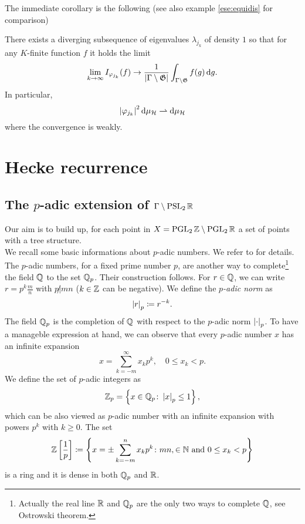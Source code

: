 The immediate corollary is the following (see also example \ref{ese:equidis} for comparison)

\begin{ncor}
There exists a diverging subsequence of eigenvalues $\lambda_{j_{k}}$ of density $1$ so that for any $K$-finite function $f$ it holds the limit
\[
\lim_{k\to\infty}I_{\varphi_{j_{k}}}(f)\to\frac{1}{\left| \Gamma\setminus\mathfrak{G}\right|}\int_{\Gamma\setminus\mathfrak{G}}f(g)\mathop{}\!\mathrm{d} g.
\]
In particular, 
\[
\left| \varphi_{j_{k}}\right|^{2}\mathop{}\!\mathrm{d}\mu_{\mathcal{H}}\rightharpoonup\mathop{}\!\mathrm{d}\mu_{\mathcal{H}}
\]
where the convergence is weakly.
\end{ncor}




\section{Hecke recurrence}

\subsection{The $p$-adic extension of $\Gamma\setminus\operatorname{PSL}_{2}\mathbb{R}$}

\label{sec:p_adic_ext}


Our aim is to build up, for each point in $X=\operatorname{PGL}_{2}\mathbb{Z}\setminus\operatorname{PGL}_{2}\mathbb{R}$ a set of points with a tree structure.\\

We recall some basic informations about $p$-adic numbers. We refer to \cite{Queva:p-adic} for details. The $p$-adic numbers, for a fixed prime number $p$, are another way to complete\footnote{Actually the real line $\mathbb{R}$ and $\mathbb{Q}_{p}$ are the only two ways to complete $\mathbb{Q}$, see Ostrowski theorem.} the field $\mathbb{Q}$ to the set $\mathbb{Q}_{p}$. Their construction follows. For $r\in\mathbb{Q}$, we can write $r=p^{k}\frac{m}{n}$ with $p\not|mn$ ($k\in\mathbb{Z}$ can be negative). We define the \emph{$p$-adic norm} as
\[
\left| r\right|_{p}\coloneqq r^{-k}.
\]
The field $\mathbb{Q}_{p}$ is the completion of $\mathbb{Q}$ with respect to the $p$-adic norm $\left| \cdot\right|_{p}$. To have a manageble expression at hand, we can observe that every $p$-adic number $x$ has an infinite expansion
\[
x=\sum_{k=-m}^{\infty}x_{k}p^{k},\quad 0\leq x_{k}<p.
\]
We define the set of $p$-adic integers as
\[
\mathbb{Z}_{p}=\left\{
x\in\mathbb{Q}_{p}\colon\left| x\right|_{p}\leq 1
\right\},
\]
which can be also viewed as $p$-adic number with an infinite expansion with powers $p^{k}$ with $k\geq0$. The set
\[
\mathbb{Z}\left[
\frac{1}{p}\right]\coloneqq\left\{
x=\pm\sum_{k=-m}^{n}x_{k}p^{k}\colon mn,\in\mathbb{N}\text{ and }0\leq x_{k}<p
\right\}
\]
is a ring and it is dense in both $\mathbb{Q}_{p}$ and $\mathbb{R}$.

